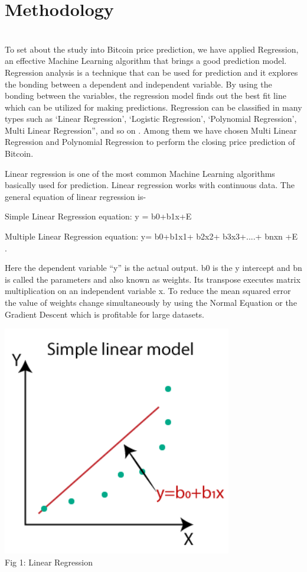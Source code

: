 \documentclass{IEEEtran}
\begin{document}
\section{Methodology}
\\ To set about the study into Bitcoin price prediction, we have applied Regression, an effective Machine Learning algorithm that brings a good prediction model. Regression analysis is a technique that can be used for prediction and it explores the bonding between a dependent and independent variable. By using the bonding between the variables, the regression model finds out the best fit line which can be utilized for making predictions. Regression can be classified in many types such as ‘Linear Regression’, ‘Logistic Regression’, ‘Polynomial Regression’, Multi Linear Regression”, and so on \cite{Pant2019}. Among them we have chosen Multi Linear Regression and Polynomial Regression to perform the closing price prediction of Bitcoin.

 Linear regression is one of the most common Machine Learning algorithms basically used for prediction. Linear regression works with continuous data. The general equation of linear regression is-

Simple Linear Regression equation:       y = b0+b1x+E

Multiple Linear Regression equation:     y= b0+b1x1+ b2x2+ b3x3+....+ bnxn +E \cite{Aa}.

Here the dependent variable “y” is the actual output. b0 is the y intercept and bn is called the parameters and also known as weights. Its transpose executes matrix multiplication on an independent variable x. To reduce the mean squared error the value of weights change simultaneously by using the Normal Equation or the Gradient Descent which is profitable for large datasets\cite{Vaddi2020}.

\begin{right}
\centering
\includegraphics[scale=1]{linear.PNG}
\\\caption{Fig 1: Linear Regression} \\

\end{right}
\end{document}
